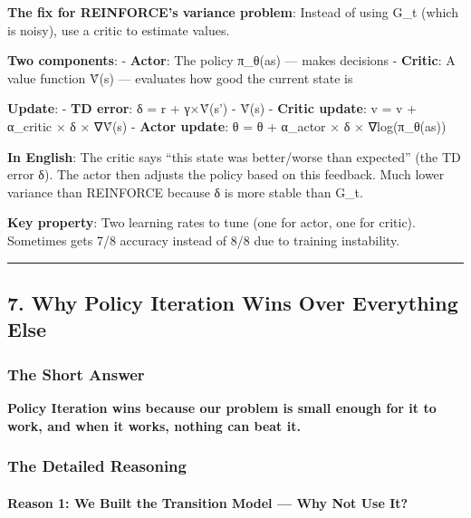 \documentclass[
]{article}
\begin{document}
\textbf{The fix for REINFORCE's variance problem}: Instead of using G\_t
(which is noisy), use a critic to estimate values.

\textbf{Two components}: - \textbf{Actor}: The policy π\_θ(a\textbar s)
--- makes decisions - \textbf{Critic}: A value function V̂(s) ---
evaluates how good the current state is

\textbf{Update}: - \textbf{TD error}: δ = r + γ×V̂(s') - V̂(s) -
\textbf{Critic update}: v = v + α\_critic × δ × ∇V̂(s) - \textbf{Actor
update}: θ = θ + α\_actor × δ × ∇log(π\_θ(a\textbar s))

\textbf{In English}: The critic says ``this state was better/worse than
expected'' (the TD error δ). The actor then adjusts the policy based on
this feedback. Much lower variance than REINFORCE because δ is more
stable than G\_t.

\textbf{Key property}: Two learning rates to tune (one for actor, one
for critic). Sometimes gets 7/8 accuracy instead of 8/8 due to training
instability.

\begin{center}\rule{0.5\linewidth}{0.5pt}\end{center}

\hypertarget{why-policy-iteration-wins-over-everything-else}{%
\subsection{7. Why Policy Iteration Wins Over Everything
Else}\label{why-policy-iteration-wins-over-everything-else}}

\hypertarget{the-short-answer}{%
\subsubsection{The Short Answer}\label{the-short-answer}}

\textbf{Policy Iteration wins because our problem is small enough for it
to work, and when it works, nothing can beat it.}

\hypertarget{the-detailed-reasoning}{%
\subsubsection{The Detailed Reasoning}\label{the-detailed-reasoning}}

\hypertarget{reason-1-we-built-the-transition-model-why-not-use-it}{%
\paragraph{Reason 1: We Built the Transition Model --- Why Not Use
It?}\label{reason-1-we-built-the-transition-model-why-not-use-it}}
\end{document}
